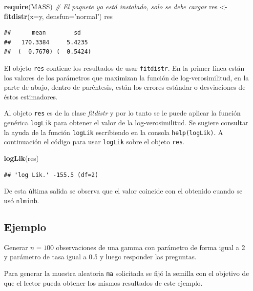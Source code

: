 \documentclass[10pt,]{krantz}
\makeatletter
\newenvironment{Shaded}{\begin{snugshade}}{\end{snugshade}}
\newcommand{\KeywordTok}[1]{\textcolor[rgb]{0.13,0.29,0.53}{\textbf{{#1}}}}
\newcommand{\DataTypeTok}[1]{\textcolor[rgb]{0.13,0.29,0.53}{{#1}}}
\newcommand{\StringTok}[1]{\textcolor[rgb]{0.31,0.60,0.02}{{#1}}}
\newcommand{\CommentTok}[1]{\textcolor[rgb]{0.56,0.35,0.01}{\textit{{#1}}}}
\newcommand{\NormalTok}[1]{{#1}}
\newenvironment{kframe}{%
\medskip{}
\setlength{\fboxsep}{.8em}
 \def\at@end@of@kframe{}%
 \ifinner\ifhmode%
  \def\at@end@of@kframe{\end{minipage}}%
  \begin{minipage}{\columnwidth}%
 \fi\fi%
 \def\FrameCommand##1{\hskip\@totalleftmargin \hskip-\fboxsep
 \colorbox{shadecolor}{##1}\hskip-\fboxsep
     \hskip-\linewidth \hskip-\@totalleftmargin \hskip\columnwidth}%
 \MakeFramed {\advance\hsize-\width
   \@totalleftmargin\z@ \linewidth\hsize
   \@setminipage}}%
 {\par\unskip\endMakeFramed%
 \at@end@of@kframe}
\renewenvironment{Shaded}{\begin{kframe}}{\end{kframe}}
\makeatother
\begin{document}
\begin{Shaded}
\begin{Highlighting}[]
\KeywordTok{require}\NormalTok{(MASS)  }\CommentTok{# El paquete ya está instalado, solo se debe cargar}
\NormalTok{res <-}\StringTok{ }\KeywordTok{fitdistr}\NormalTok{(}\DataTypeTok{x=}\NormalTok{y, }\DataTypeTok{densfun=}\StringTok{'normal'}\NormalTok{)}
\NormalTok{res}
\end{Highlighting}
\end{Shaded}

\begin{verbatim}
##      mean        sd   
##   170.3384     5.4235 
##  (  0.7670) (  0.5424)
\end{verbatim}

El objeto \texttt{res} contiene los resultados de usar
\texttt{fitdistr}. En la primer línea están los valores de los
parámetros que maximizan la función de log-verosimilitud, en la parte de
abajo, dentro de paréntesis, están los errores estándar o desviaciones
de éstos estimadores.

Al objeto \texttt{res} es de la clase \emph{fitdistr} y por lo tanto se
le puede aplicar la función genérica \texttt{logLik} para obtener el
valor de la log-verosimilitud. Se sugiere consultar la ayuda de la
función \texttt{logLik} escribiendo en la consola \texttt{help(logLik)}.
A continuación el código para usar \texttt{logLik} sobre el objeto
\texttt{res}.

\begin{Shaded}
\begin{Highlighting}[]
\KeywordTok{logLik}\NormalTok{(res)}
\end{Highlighting}
\end{Shaded}

\begin{verbatim}
## 'log Lik.' -155.5 (df=2)
\end{verbatim}

De esta última salida se observa que el valor coincide con el obtenido
cuando se usó \texttt{nlminb}.

\subsection*{Ejemplo}\label{ejemplo-51}


Generar \(n=100\) observaciones de una gamma con parámetro de forma
igual a 2 y parámetro de tasa igual a 0.5 y luego responder las
preguntas.

Para generar la muestra aleatoria \texttt{ma} solicitada se fijó la
semilla con el objetivo de que el lector pueda obtener los mismos
resultados de este ejemplo.
\end{document}
